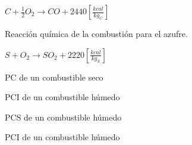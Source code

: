 \documentclass[11pt,a4paper]{article}
\newcommand{\vs}{\vspace{-.3cm}}
\begin{document}
\begin{multicols}{2}
\begin{cajita}
		$C + \frac{1}{2} O_2 \rightarrow CO + \boxed{2440} \left[\frac{kcal}{kg_C}\right]$
			
		\vspace{-.8cm}
		
		\begin{flushleft}
			Reacción química de la combustión para el azufre.
		\end{flushleft}\vs
	
		$S + O_2 \rightarrow SO_2 + \boxed{2220} \left[\frac{kcal}{kg_S}\right] $
		
		\end{cajita}
		\columnbreak
		\begin{cajita}
			
			\vspace{-.8cm}
			
			\begin{flushleft}
				PC de un combustible seco
			\end{flushleft}
			
			\vspace{-.2cm}
		
			
			\begin{flushleft}
				PCI de un combustible húmedo
			\end{flushleft}
			
			\vspace{-.2cm}
			
			
			
			\vspace{-.8cm}
			
			\begin{flushleft}
				PCS de un combustible húmedo
			\end{flushleft}
		
			\vspace{-.2cm}
			
			
			
			\vspace{-.8cm}
			
			\begin{flushleft}
				PCI de un combustible húmedo
			\end{flushleft}
			

\end{cajita}
\end{multicols}
\end{document}
